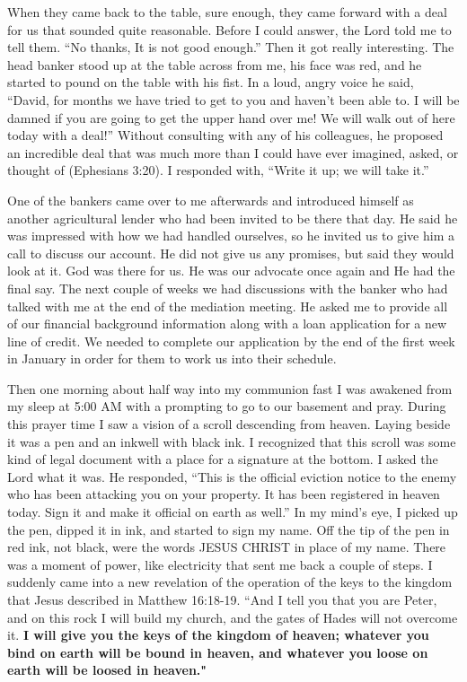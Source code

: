 \documentclass[twoside, 12pt]{book}
\begin{document}
When they came back to the table, sure enough, they came forward with a deal for us that sounded quite reasonable. Before I could answer, the Lord told me to tell them. “No thanks, It is not good enough.” Then it got really interesting. The head banker stood up at the table across from me, his face was red, and he started to pound on the table with his fist. In a loud, angry voice he said, “David, for months we have tried to get to you and haven’t been able to. I will be damned if you are going to get the upper hand over me! We will walk out of here today with a deal!” Without consulting with any of his colleagues, he proposed an incredible deal that was much more than I could have ever imagined, asked, or thought of (Ephesians 3:20). I responded with, “Write it up; we will take it.” 

One of the bankers came over to me afterwards and introduced himself as another agricultural lender who had been invited to be there that day. He said he was impressed with how we had handled ourselves, so he invited us to give him a call to discuss our account. He did not give us any promises, but said they would look at it. God was there for us. He was our advocate once again and He had the final say. The next couple of weeks we had discussions with the banker who had talked with me at the end of the mediation meeting. He asked me to provide all of our financial background information along with a loan application for a new line of credit. We needed to complete our application by the end of the first week in January in order for them to work us into their schedule.

Then one morning about half way into my communion fast I was awakened from my sleep at 5:00 AM with a prompting to go to our basement and pray. During this prayer time I saw a vision of a scroll descending from heaven. Laying beside it was a pen and an inkwell with black ink. I recognized that this scroll was some kind of legal document with a place for a signature at the bottom. I asked the Lord what it was. He responded, “This is the official eviction notice to the enemy who has been attacking you on your property. It has been registered in heaven today. Sign it and make it official on earth as well.” In my mind’s eye, I picked up the pen, dipped it in ink, and started to sign my name. Off the tip of the pen in red ink, not black, were the words JESUS CHRIST in place of my name. There was a moment of power, like electricity that sent me back a couple of steps. I suddenly came into a new revelation of the operation of the keys to the kingdom that Jesus described in Matthew 16:18-19. “And I tell you that you are Peter, and on this rock I will build my church, and the gates of Hades will not overcome it. \textbf{I will give you the keys of the kingdom of heaven; whatever you bind on earth will be bound in heaven, and whatever you loose on earth will be loosed in heaven."}
\end{document}

